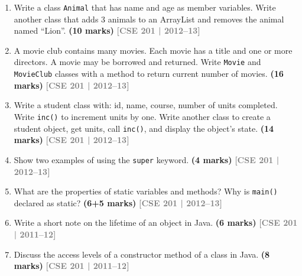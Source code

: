 \documentclass[12pt,a3paper]{article}
\newcommand{\yr}[1]{\hfill\textcolor{gray}{\small\textbf{[#1]}}}
\newcommand{\mk}[1]{\textcolor{orange!70!black}{\small\textbf{(#1 marks)}}}
\begin{document}
\begin{enumerate}
\item Write a class \texttt{Animal} that has name and age as member variables. Write another class that adds 3 animals to an ArrayList and removes the animal named ``Lion''. \mk{10}
\yr{CSE 201 | 2012--13}




\item A movie club contains many movies. Each movie has a title and one or more directors. A movie may be borrowed and returned. Write \texttt{Movie} and \texttt{MovieClub} classes with a method to return current number of movies. \mk{16}
\yr{CSE 201 | 2012--13}




\item Write a student class with: id, name, course, number of units completed. Write \texttt{inc()} to increment units by one. Write another class to create a student object, get units, call \texttt{inc()}, and display the object's state. \mk{14}
\yr{CSE 201 | 2012--13}




\item Show two examples of using the \texttt{super} keyword. \mk{4}
\yr{CSE 201 | 2012--13}




\item What are the properties of static variables and methods? Why is \texttt{main()} declared as static? \mk{6+5}
\yr{CSE 201 | 2012--13}




\item Write a short note on the lifetime of an object in Java. \mk{6}
\yr{CSE 201 | 2011--12}




\item Discuss the access levels of a constructor method of a class in Java. \mk{8}
\yr{CSE 201 | 2011--12}


\end{enumerate}
\end{document}
